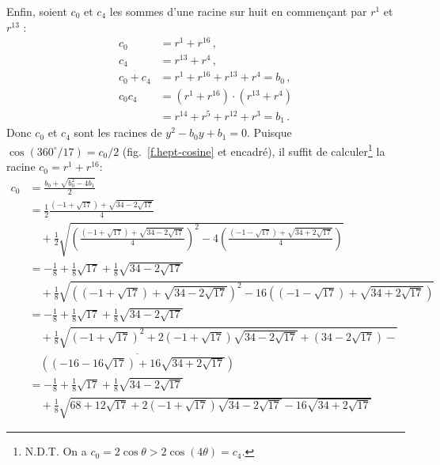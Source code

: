 Enfin, soient $c_0$ et $c_4$ les sommes d'une racine sur huit en commençant par $r^1$ et $r^{13}$ :
\begin{align*}
c_0&=r^1+r^{16}\,,\\
c_4&=r^{13}+r^4\,,\\
c_0+c_4&=r^1+r^{16}+r^{13}+r^4=b_0\,,\\
c_0c_4&=(r^1+r^{16})\cdot(r^{13}+r^4)\\
&=r^{14}+r^5+r^{12}+r^3=b_1\,.
\end{align*}
Donc $c_0$ et $c_4$ sont les racines de $y^2-b_0y+b_1=0$. Puisque $\cos(360^\circ/17) = c_0/2$ (fig.~\ref{f.hept-cosine} et encadré), il suffit de calculer\footnote{N.D.T. On a $c_0=2\cos \theta>2\cos(4\theta)=c_4$.} la racine $c_0=r^1+r^{16}$:
\begin{align*}
c_0&=\frac{b_0+\sqrt{b_0^2-4b_1}}{2}\\
&=\frac{1}{2}
     \frac{
     (-1+\sqrt{17}) + 
     \sqrt{34-2\sqrt{17}}
   }{4} \\
&\quad  +
    \frac{1}{2}
       \sqrt{\left(\frac{
     (-1+\sqrt{17}) + 
     \sqrt{34-2\sqrt{17}}
   }{4}\right)^2-4\left(\frac{
     (-1-\sqrt{17}) + 
     \sqrt{34+2\sqrt{17}}
   }{4}\right)}
   \\
&=-\frac{1}{8}+\frac{1}{8}\sqrt{17} + 
     \frac{1}{8}\sqrt{34-2\sqrt{17}}
     \\
   &\quad + 
     \frac{1}{8}\sqrt{
     \left(
     (-1+\sqrt{17}) + 
     \sqrt{34-2\sqrt{17}}
   \right)^2-16\left(
     (-1-\sqrt{17}) + 
     \sqrt{34+2\sqrt{17}}
   \right)}
\\
&=-\frac{1}{8}+\frac{1}{8}\sqrt{17} + 
     \frac{1}{8}\sqrt{34-2\sqrt{17}}
    \\
   &\quad +
     \frac{1}{8}\sqrt{
     (-1+\sqrt{17})^2 + 
     2(-1+\sqrt{17})\sqrt{34-2\sqrt{17}}+
     (34-2\sqrt{17})
   -}\\
   &\quad \overline{
     \left((-16-16\sqrt{17}) + 
     16\sqrt{34+2\sqrt{17}}\right)
   }
\\
&=-\frac{1}{8}+\frac{1}{8}\sqrt{17} + 
     \frac{1}{8}\sqrt{34-2\sqrt{17}}
     \\
   &\quad +
     \frac{1}{8}\sqrt{
     68+12\sqrt{17} + 
     2(-1+\sqrt{17})\sqrt{34-2\sqrt{17}}
   -16
     \sqrt{34+2\sqrt{17}}
   }
\end{align*}

